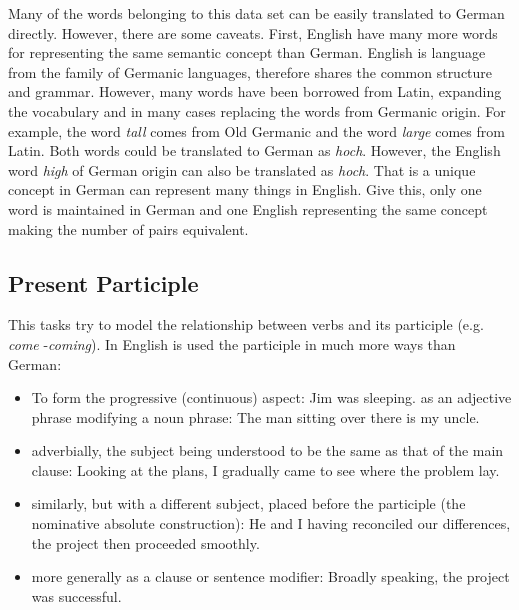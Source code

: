 Many of the words belonging to this data set can be easily translated to
German directly. However, there are some caveats. First, English have many
more words for representing the same semantic concept than German.  English is language from
the family of Germanic languages, therefore shares the common structure
and grammar. However, many words have been borrowed from Latin, expanding the
vocabulary  and in many cases replacing the words from Germanic origin. 
For example, the word \textit{tall}  comes from Old Germanic and  the
word \textit{large} comes from Latin. Both words could be translated to
German as \textit{hoch}. However, the English word  \textit{high} of German
origin can also be translated as \textit{hoch}.
That is a unique concept in German can represent many things in English. 
Give this, only one word is maintained in German and one English representing
the same concept making the number of pairs equivalent.


%
\subsection{Present Participle}
\label{sec:sub_sec_present_participle}

This tasks try to model the relationship between verbs and its participle
(e.g. \textit{come} -\textit{coming}). In English is used the participle in
much more ways than German: 

\begin{itemize}
\item  To form the progressive (continuous) aspect: Jim was sleeping. as an
  adjective phrase modifying a noun phrase: The man sitting over there is my
  uncle.
\item adverbially, the subject being understood to be the same as that
  of the main clause: Looking at the plans, I gradually came to see where the
  problem lay.
\item  similarly, but with a different subject, placed before the
  participle (the nominative absolute construction): He and I having
  reconciled our differences, the project then proceeded smoothly.
\item more
  generally as a clause or sentence modifier: Broadly speaking, the project
  was successful.

\end{itemize}

